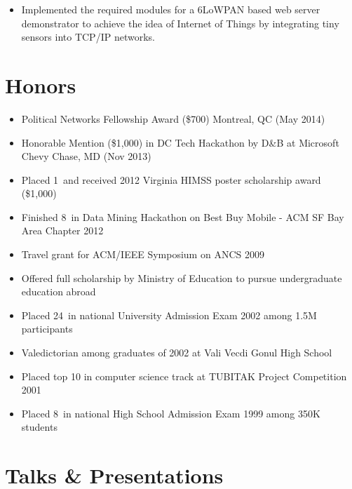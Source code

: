 \documentclass[11pt, letter]{article}
\begin{document}
\begin{raggedright}
\begin{itemize}
\itemsep1pt\parskip0pt
\item
  Implemented the required modules for a 6LoWPAN based web server
  demonstrator to achieve the idea of Internet of Things by integrating
  tiny sensors into TCP/IP networks.
\end{itemize}

\section{Honors}\label{honors}

\begin{itemize}
\itemsep1pt\parskip0pt
\item
  Political Networks Fellowship Award (\$700) Montreal, QC (May 2014)
\item
  Honorable Mention (\$1,000) in DC Tech Hackathon by D\&B at Microsoft
  Chevy Chase, MD (Nov 2013)
\item
  Placed 1~and received 2012 Virginia HIMSS poster scholarship award
  (\$1,000)
\item
  Finished 8~in Data Mining Hackathon on Best Buy Mobile - ACM SF Bay
  Area Chapter 2012
\item
  Travel grant for ACM/IEEE Symposium on ANCS 2009
\item
  Offered full scholarship by Ministry of Education to pursue
  undergraduate education abroad
\item
  Placed 24~in national University Admission Exam 2002 among 1.5M
  participants
\item
  Valedictorian among graduates of 2002 at Vali Vecdi Gonul High School
\item
  Placed top 10 in computer science track at TUBITAK Project Competition
  2001
\item
  Placed 8~in national High School Admission Exam 1999 among 350K
  students
\end{itemize}

\section{Talks \& Presentations}\label{talks-presentations}


\end{raggedright}
\end{document}
